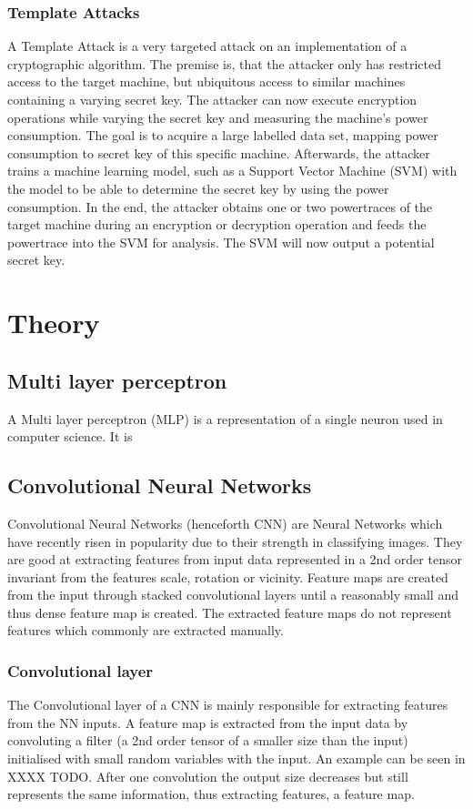 \documentclass[journal]{IEEEtran}
\begin{document}
\subsubsection{Template Attacks}
\label{subsec:template}
A Template Attack is a very targeted attack on an implementation of a cryptographic algorithm. The premise is, that the attacker only has restricted access to the target machine, but ubiquitous access to similar machines containing a varying secret key. The attacker can now execute encryption operations while varying the secret key and measuring the machine's power consumption. The goal is to acquire a large labelled data set, mapping power consumption to secret key of this specific machine. Afterwards, the attacker trains a machine learning model, such as a Support Vector Machine (SVM) with the model to be able to determine the secret key by using the power consumption. In the end, the attacker obtains one or two powertraces of the target machine during an encryption or decryption operation and feeds the powertrace into the SVM for analysis. The SVM will now output a potential secret key.


\section{Theory}
\subsection{Multi layer perceptron}
\label{sc:mlp}
A Multi layer perceptron (MLP) is a representation of a single neuron used in computer science. It is 
\subsection{Convolutional Neural Networks}
Convolutional Neural Networks (henceforth CNN) are Neural Networks which have recently risen in popularity due to their strength in classifying images. They are good at extracting features from input data represented in a 2nd order tensor invariant from the features scale, rotation or vicinity. Feature maps are created from the input through stacked convolutional layers until a reasonably small and thus dense feature map is created. The extracted feature maps do not represent features which commonly are extracted manually. 
\subsubsection{Convolutional layer}
The Convolutional layer of a CNN is mainly responsible for extracting features from the NN inputs. A feature map is extracted from the input data by convoluting a filter (a 2nd order tensor of a smaller size than the input) initialised with small random variables with the input. An example can be seen in XXXX TODO. After one convolution the output size decreases but still represents the same information, thus extracting features, a feature map.  
\end{document}
